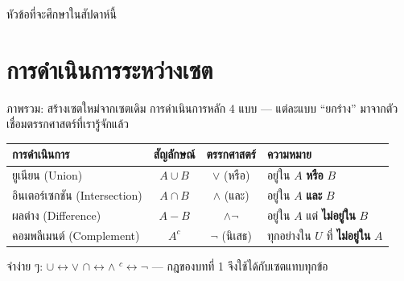 \begin{frame}{หัวข้อที่จะศึกษาในสัปดาห์นี้}
  \tableofcontents
\end{frame}


\section{การดำเนินการระหว่างเซต}

\begin{frame}{ภาพรวม: สร้างเซตใหม่จากเซตเดิม}
  การดำเนินการหลัก 4 แบบ --- แต่ละแบบ ``ยกร่าง'' มาจากตัวเชื่อมตรรกศาสตร์ที่เรารู้จักแล้ว
  \begin{center}
  \begin{tabular}{|l|c|c|l|}
    \hline
    \textbf{การดำเนินการ} & \textbf{สัญลักษณ์} & \textbf{ตรรกศาสตร์} & \textbf{ความหมาย} \\ \hline
    ยูเนียน (Union) & $A \cup B$ & $\lor$ (หรือ) & อยู่ใน $A$ \textbf{หรือ} $B$ \\ \hline
    อินเตอร์เซกชัน (Intersection) & $A \cap B$ & $\land$ (และ) & อยู่ใน $A$ \textbf{และ} $B$ \\ \hline
    ผลต่าง (Difference) & $A - B$ & $\land\neg$ & อยู่ใน $A$ แต่ \textbf{ไม่อยู่ใน} $B$ \\ \hline
    คอมพลีเมนต์ (Complement) & $A^c$ & $\neg$ (นิเสธ) & ทุกอย่างใน $U$ ที่ \textbf{ไม่อยู่ใน} $A$ \\ \hline
  \end{tabular}
  \end{center}
  \vspace{0.4em}
  \begin{exampleblock}{}
    จำง่าย ๆ: $\cup \leftrightarrow \lor$ \quad $\cap \leftrightarrow \land$ \quad $^c \leftrightarrow \neg$ ---
    กฎของบทที่ 1 จึงใช้ได้กับเซตแทบทุกข้อ
  \end{exampleblock}
\end{frame}

